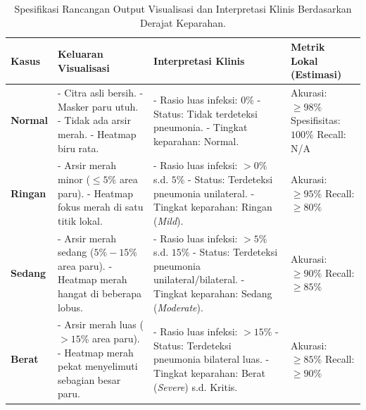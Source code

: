 \documentclass[12pt,a4paper,oneside]{book}
\begin{document}
\begin{table}[H]
  \centering
  \caption{Spesifikasi Rancangan Output Visualisasi dan Interpretasi Klinis Berdasarkan Derajat Keparahan.}
  \label{tab:rancangan_output_kasus}
  \begin{tabularx}{\textwidth}{l X X p{3.8cm}}
    \toprule
    \textbf{Kasus} & \textbf{Keluaran Visualisasi} & \textbf{Interpretasi Klinis} & \textbf{Metrik Lokal (Estimasi)} \\
    \midrule
    \textbf{Normal} & 
    - Citra asli bersih. \newline 
    - Masker paru utuh. \newline 
    - Tidak ada arsir merah. \newline 
    - Heatmap biru rata. & 
    - Rasio luas infeksi: $0\%$ \newline 
    - Status: Tidak terdeteksi pneumonia. \newline 
    - Tingkat keparahan: Normal. & 
    Akurasi: $\ge 98\%$ \newline 
    Spesifisitas: $100\%$ \newline 
    Recall: N/A \\
    \midrule
    \textbf{Ringan} & 
    - Arsir merah minor ($\le 5\%$ area paru). \newline 
    - Heatmap fokus merah di satu titik lokal. & 
    - Rasio luas infeksi: $>0\%$ s.d. $5\%$ \newline 
    - Status: Terdeteksi pneumonia unilateral. \newline 
    - Tingkat keparahan: Ringan (\textit{Mild}). & 
    Akurasi: $\ge 95\%$ \newline 
    Recall: $\ge 80\%$ \\
    \midrule
    \textbf{Sedang} & 
    - Arsir merah sedang ($5\% - 15\%$ area paru). \newline 
    - Heatmap merah hangat di beberapa lobus. & 
    - Rasio luas infeksi: $>5\%$ s.d. $15\%$ \newline 
    - Status: Terdeteksi pneumonia unilateral/bilateral. \newline 
    - Tingkat keparahan: Sedang (\textit{Moderate}). & 
    Akurasi: $\ge 90\%$ \newline 
    Recall: $\ge 85\%$ \\
    \midrule
    \textbf{Berat} & 
    - Arsir merah luas ($> 15\%$ area paru). \newline 
    - Heatmap merah pekat menyelimuti sebagian besar paru. & 
    - Rasio luas infeksi: $>15\%$ \newline 
    - Status: Terdeteksi pneumonia bilateral luas. \newline 
    - Tingkat keparahan: Berat (\textit{Severe}) s.d. Kritis. & 
    Akurasi: $\ge 85\%$ \newline 
    Recall: $\ge 90\%$ \\
    \bottomrule
  \end{tabularx}
\end{table}
\end{document}
